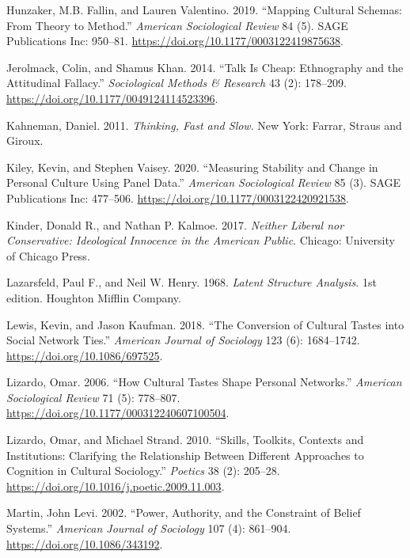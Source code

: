 \documentclass[12pt,]{article}
\begin{document}
\leavevmode\hypertarget{ref-hunzaker2019}{}%
Hunzaker, M.B. Fallin, and Lauren Valentino. 2019. ``Mapping Cultural Schemas: From Theory to Method.'' \emph{American Sociological Review} 84 (5). SAGE Publications Inc: 950--81. \url{https://doi.org/10.1177/0003122419875638}.

\leavevmode\hypertarget{ref-jerolmack2014}{}%
Jerolmack, Colin, and Shamus Khan. 2014. ``Talk Is Cheap: Ethnography and the Attitudinal Fallacy.'' \emph{Sociological Methods \& Research} 43 (2): 178--209. \url{https://doi.org/10.1177/0049124114523396}.

\leavevmode\hypertarget{ref-kahneman2011}{}%
Kahneman, Daniel. 2011. \emph{Thinking, Fast and Slow}. New York: Farrar, Straus and Giroux.

\leavevmode\hypertarget{ref-kiley2020}{}%
Kiley, Kevin, and Stephen Vaisey. 2020. ``Measuring Stability and Change in Personal Culture Using Panel Data.'' \emph{American Sociological Review} 85 (3). SAGE Publications Inc: 477--506. \url{https://doi.org/10.1177/0003122420921538}.

\leavevmode\hypertarget{ref-kinder2017}{}%
Kinder, Donald R., and Nathan P. Kalmoe. 2017. \emph{Neither Liberal nor Conservative: Ideological Innocence in the American Public}. Chicago: University of Chicago Press.

\leavevmode\hypertarget{ref-lazarsfeld1968}{}%
Lazarsfeld, Paul F., and Neil W. Henry. 1968. \emph{Latent Structure Analysis}. 1st edition. Houghton Mifflin Company.

\leavevmode\hypertarget{ref-lewis2018}{}%
Lewis, Kevin, and Jason Kaufman. 2018. ``The Conversion of Cultural Tastes into Social Network Ties.'' \emph{American Journal of Sociology} 123 (6): 1684--1742. \url{https://doi.org/10.1086/697525}.

\leavevmode\hypertarget{ref-lizardo2006}{}%
Lizardo, Omar. 2006. ``How Cultural Tastes Shape Personal Networks.'' \emph{American Sociological Review} 71 (5): 778--807. \url{https://doi.org/10.1177/000312240607100504}.

\leavevmode\hypertarget{ref-lizardo2010a}{}%
Lizardo, Omar, and Michael Strand. 2010. ``Skills, Toolkits, Contexts and Institutions: Clarifying the Relationship Between Different Approaches to Cognition in Cultural Sociology.'' \emph{Poetics} 38 (2): 205--28. \url{https://doi.org/10.1016/j.poetic.2009.11.003}.

\leavevmode\hypertarget{ref-martin2002}{}%
Martin, John Levi. 2002. ``Power, Authority, and the Constraint of Belief Systems.'' \emph{American Journal of Sociology} 107 (4): 861--904. \url{https://doi.org/10.1086/343192}.
\end{document}
